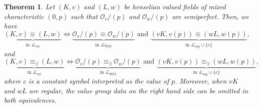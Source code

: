 \documentclass[10pt,a4paper]{amsart}
\newtheorem{thm}{Theorem}
\renewcommand{\O}{\mathcal{O}}
\begin{document}
    \begin{thm}
        \label{thm:main}
        Let $(K,v)$ and $(L,w)$ be henselian valued fields of mixed characteristic 
        $(0,p)$ 
        such that $\O_v/(p)$ and $\O_w/(p)$ are semiperfect. Then, we have
        $$\underbrace{(K,v) \equiv (L,w)}_{\text{in }\mathcal{L}_\mathrm{val}} \Longleftrightarrow \underbrace{\mathcal{O}_v/(p) \equiv \mathcal{O}_w/(p)}_{\text{in }\mathcal{L}_{\mathrm{Witt}}}\textrm{ and } \underbrace{(vK,v(p)) 
        \equiv (wL,w(p))}_{\text{in }\mathcal{L}_{\mathrm{oag}}\cup\{c\}},$$
        and 
        $$\underbrace{(K,v) \equiv_\exists (L,w)}_{\text{in }\mathcal{L}_\mathrm{val}} \Longleftrightarrow \underbrace{\mathcal{O}_v/(p) \equiv_\exists \mathcal{O}_w/(p)}_{\text{in }\mathcal{L}_{\mathrm{Witt}}}\textrm{ and } \underbrace{(vK,v(p)) \equiv_\exists (wL,w(p))}_{\text{in }\mathcal{L}_{\mathrm{oag}}\cup\{c\}},$$
        where $c$ is a constant symbol interpreted as the value of $p$.
        Moreover, when $vK$ and $wL$ are regular, the value group data on the right hand side can be omitted in both equivalences.
    \end{thm}
\end{document}
